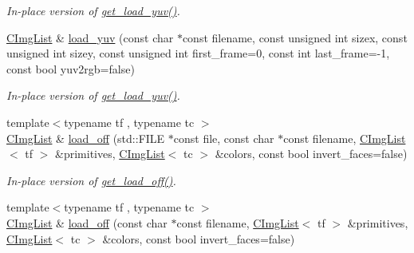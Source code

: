 \begin{DoxyCompactItemize}
\begin{DoxyCompactList}\small\item\em In-\/place version of \hyperlink{structcimg__library_1_1_c_img_list_aaa8f85db981559732ebec48625f39724}{get\_\-load\_\-yuv()}. \item\end{DoxyCompactList}\item 
\hypertarget{structcimg__library_1_1_c_img_list_a4cdbbcd088ae3b804fda7f74176f3600}{
\hyperlink{structcimg__library_1_1_c_img_list}{CImgList} \& \hyperlink{structcimg__library_1_1_c_img_list_a4cdbbcd088ae3b804fda7f74176f3600}{load\_\-yuv} (const char $\ast$const filename, const unsigned int sizex, const unsigned int sizey, const unsigned int first\_\-frame=0, const int last\_\-frame=-\/1, const bool yuv2rgb=false)}
\label{structcimg__library_1_1_c_img_list_a4cdbbcd088ae3b804fda7f74176f3600}

\begin{DoxyCompactList}\small\item\em In-\/place version of \hyperlink{structcimg__library_1_1_c_img_list_aaa8f85db981559732ebec48625f39724}{get\_\-load\_\-yuv()}. \item\end{DoxyCompactList}\item 
\hypertarget{structcimg__library_1_1_c_img_list_adc337c2c384a0e2645fdc80583d98845}{
{\footnotesize template$<$typename tf , typename tc $>$ }\\\hyperlink{structcimg__library_1_1_c_img_list}{CImgList} \& \hyperlink{structcimg__library_1_1_c_img_list_adc337c2c384a0e2645fdc80583d98845}{load\_\-off} (std::FILE $\ast$const file, const char $\ast$const filename, \hyperlink{structcimg__library_1_1_c_img_list}{CImgList}$<$ tf $>$ \&primitives, \hyperlink{structcimg__library_1_1_c_img_list}{CImgList}$<$ tc $>$ \&colors, const bool invert\_\-faces=false)}
\label{structcimg__library_1_1_c_img_list_adc337c2c384a0e2645fdc80583d98845}

\begin{DoxyCompactList}\small\item\em In-\/place version of \hyperlink{structcimg__library_1_1_c_img_list_ae7b63a914d821432d97b0986231c3246}{get\_\-load\_\-off()}. \item\end{DoxyCompactList}\item 
\hypertarget{structcimg__library_1_1_c_img_list_a6a69f80f53e3bfbce58a4114557557ae}{
{\footnotesize template$<$typename tf , typename tc $>$ }\\\hyperlink{structcimg__library_1_1_c_img_list}{CImgList} \& \hyperlink{structcimg__library_1_1_c_img_list_a6a69f80f53e3bfbce58a4114557557ae}{load\_\-off} (const char $\ast$const filename, \hyperlink{structcimg__library_1_1_c_img_list}{CImgList}$<$ tf $>$ \&primitives, \hyperlink{structcimg__library_1_1_c_img_list}{CImgList}$<$ tc $>$ \&colors, const bool invert\_\-faces=false)}
\label{structcimg__library_1_1_c_img_list_a6a69f80f53e3bfbce58a4114557557ae}


\end{DoxyCompactItemize}
